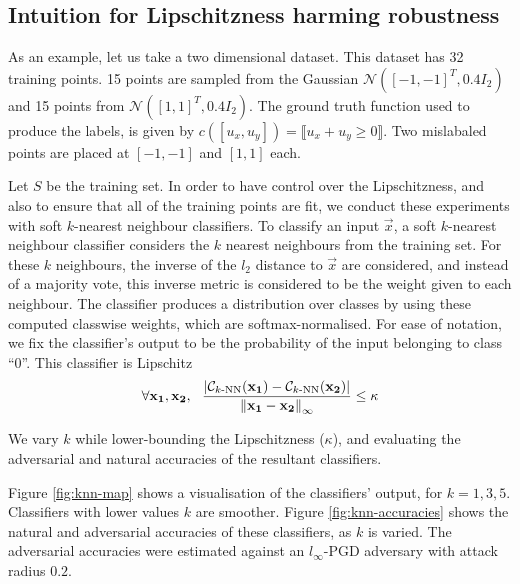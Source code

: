 \documentclass{ociamthesis}
\begin{document}
\subsection*{Intuition for Lipschitzness harming robustness}
As an example, let us take a two dimensional dataset. This dataset has 32
training points. 15 points are sampled from the Gaussian $\mathcal{N}([-1,
-1]^T, 0.4I_2)$ and 15 points from $\mathcal{N}([1, 1]^T, 0.4I_2)$. The ground
truth function used to produce the labels, is given by $c([u_x, u_y]) =
\llbracket u_x+u_y \geq 0 \rrbracket$. Two mislabaled points are placed at $[-1,
-1]$ and $[1, 1]$ each.

Let $S$ be the training set. In order to have control over the Lipschitzness,
and also to ensure that all of the training points are fit, we conduct these
experiments with soft $k$-nearest neighbour classifiers. To classify an input
$\vec{x}$, a soft $k$-nearest neighbour classifier considers the $k$ nearest
neighbours from the training set. For these $k$ neighbours, the inverse of the
$l_2$ distance to $\vec{x}$ are considered, and instead of a majority vote, this
inverse metric is considered to be the weight given to each neighbour. The
classifier produces a distribution over classes by using these computed
classwise weights, which are softmax-normalised. For ease of notation, we fix
the classifier's output to be the probability of the input belonging to class
``0''. This classifier is Lipschitz
\begin{equation*}
    \forall {\mathbf{x_1}}, {\mathbf{x_2}},~~
    \frac{|
        \mathcal{C}_{k\text{-NN}}({\mathbf{x_1}}) - \mathcal{C}_{k\text{-NN}}({\mathbf{x_2}})
    |}{\mathrm{\left\lVert{\mathbf{x_1}} - {\mathbf{x_2}}\right\rVert}_\infty}
    \leq \kappa
\end{equation*}

We vary $k$ while lower-bounding the Lipschitzness ($\kappa$), and evaluating
the adversarial and natural accuracies of the resultant classifiers.

Figure \ref{fig:knn-map} shows a visualisation of the classifiers' output, for
$k=1,3,5$. Classifiers with lower values $k$ are smoother. Figure
\ref{fig:knn-accuracies} shows the natural and adversarial accuracies of these
classifiers, as $k$ is varied. The adversarial accuracies were estimated against
an $l_\infty$-PGD adversary with attack radius $0.2$.
\end{document}
